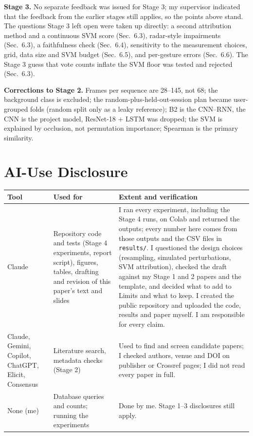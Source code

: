 \documentclass[11pt]{article}
\begin{document}
\textbf{Stage 3.} No separate feedback was issued for Stage 3; my supervisor indicated that the feedback from the earlier stages still applies, so the points above stand. The questions Stage 3 left open were taken up directly: a second attribution method and a continuous SVM score (Sec.~6.3), radar-style impairments (Sec.~6.3), a faithfulness check (Sec.~6.4), sensitivity to the measurement choices, grid, data size and SVM budget (Sec.~6.5), and per-gesture errors (Sec.~6.6). The Stage 3 guess that vote counts inflate the SVM floor was tested and rejected (Sec.~6.3).

\textbf{Corrections to Stage 2.} Frames per sequence are 28--145, not 68; the background class is excluded; the random-plus-held-out-session plan became user-grouped folds (random split only as a leaky reference); B2 is the CNN--RNN, the CNN is the project model, ResNet-18 + LSTM was dropped; the SVM is explained by occlusion, not permutation importance; Spearman is the primary similarity.

\section*{AI-Use Disclosure}
\begin{table}[H]
\centering
\footnotesize
\begin{tabular}{@{}p{2.2cm}p{4.0cm}p{9.2cm}@{}}
\toprule
\textbf{Tool} & \textbf{Used for} & \textbf{Extent and verification} \\
\midrule
Claude & Repository code and tests (Stage 4 experiments, report script), figures, tables, drafting and revision of this paper's text and slides & I ran every experiment, including the Stage 4 runs, on Colab and returned the outputs; every number here comes from those outputs and the CSV files in \texttt{results/}. I questioned the design choices (resampling, simulated perturbations, SVM attribution), checked the draft against my Stage 1 and 2 papers and the template, and decided what to add to Limits and what to keep. I created the public repository and uploaded the code, results and paper myself. I am responsible for every claim. \\
Claude, Gemini, Copilot, ChatGPT, Elicit, Consensus & Literature search, metadata checks (Stage 2) & Used to find and screen candidate papers; I checked authors, venue and DOI on publisher or Crossref pages; I did not read every paper in full. \\
None (me) & Database queries and counts; running the experiments & Done by me. Stage 1--3 disclosures still apply. \\
\bottomrule
\end{tabular}
\end{table}



\end{document}
